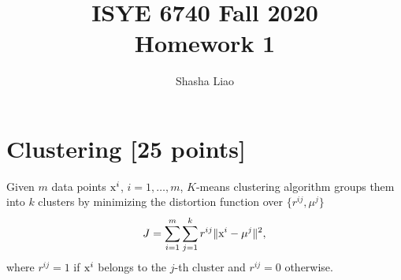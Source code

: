 \documentclass[twoside,10pt]{article}
\begin{document}
\title{ISYE 6740 Fall 2020\\ Homework 1}
\author{Shasha Liao}
\date{}

\maketitle



\section{Clustering [25 points]}



Given $m$ data points $\text x^i$, $i=1,\dots, m$, $K$-means clustering algorithm groups them into $k$ clusters by minimizing the distortion function over $\{ r^{ij}, \mu^j \}$
$$J=\sum_{i=1}^m\sum_{j=1}^k r^{ij} \|\text x^i-\mu^j\|^2,$$
where $r^{ij}=1$ if $\text x^i$ belongs to the $j$-th cluster and $r^{ij}=0$ otherwise.
\end{document}
